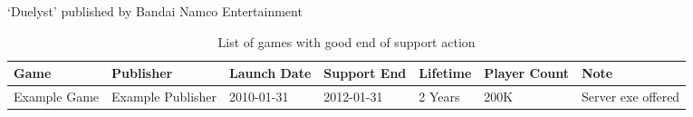 `Duelyst' published by Bandai Namco Entertainment

\begin{landscape}
    \begin{table}[htbp]
        \centering
        \caption{List of games with good end of support action}%
        \label{tab:savedgames}
        \begin{tabular*}{1\textwidth}{lllllll}
            Game & Publisher & Launch Date & Support End & Lifetime & Player Count & Note \\ \toprule
            Example Game & Example Publisher & 2010-01-31 & 2012-01-31 & 2 Years & 200K & Server exe offered \\
        \end{tabular*}
    \end{table}
\end{landscape}
